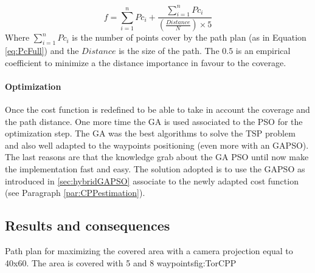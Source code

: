   \begin{equation} \label{eq:CostF2}
f=\sum_{i=1}^{n}Pc_i + \frac{\sum_{i=1}^{n}Pc_i}{(\frac{Distance}{N})\times 5}  
\end{equation}  %
Where $\sum_{i=1}^{n}Pc_i$ is the number of points cover by the path plan (as  in  Equation \ref{eq:PcFull}) and the $Distance$  is  the size of the path. The $0.5$ is an empirical coefficient to minimize a the distance importance in favour to the coverage.



\paragraph*{Optimization}
 Once the cost function is redefined to be able to take in account the coverage and the path distance.
One more time the GA is used associated to the PSO for the optimization step. %
The GA was the best algorithms to solve the TSP problem and also well adapted to the waypoints positioning (even more with an GAPSO). The last reasons are that the knowledge grab about the GA PSO until now make the implementation fast and easy.
 The solution adopted is to use the GAPSO as introduced in \ref{sec:hybridGAPSO} associate to the newly adapted cost function (see Paragraph \ref{par:CPPestimation}).


		\subsection{Results  and consequences }
\begin{mfigures}[!]{Path plan for maximizing the covered area with a camera projection  equal to 40x60. The area is covered  with 5 and 8 waypoints}{fig:TorCPP} \centering
{}
\hspace{1cm}

\hspace{1cm}
\end{mfigures}
		

